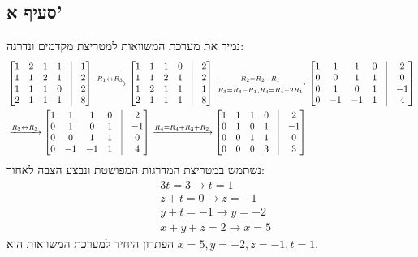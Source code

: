 \documentclass[a4paper, 10pt]{article}
\begin{document}
\begin{hebrew}
	\subsection{סעיף א'}
	נמיר את מערכת המשוואות למטריצת מקדמים ונדרגה:
	\[
		\begin{aligned}
			& \begin{bmatrix}
			1 & 2 & 1 & 1 & \vline & 1 \\
			1 & 1 & 2 & 1 & \vline & 2 \\
			1 & 1 & 1 & 0 & \vline & 2 \\
			2 & 1 & 1 & 1 & \vline & 8
			\end{bmatrix}
			\xrightarrow{R_1 \leftrightarrow R_3}
			\begin{bmatrix}
			1 & 1 & 1 & 0 & \vline & 2 \\
			1 & 1 & 2 & 1 & \vline & 2 \\
			1 & 2 & 1 & 1 & \vline & 1 \\
			2 & 1 & 1 & 1 & \vline & 8
			\end{bmatrix}
			\xrightarrow[R_3 = R_3 - R_1, R_4 = R_4 - 2R_1] {R_2 = R_2 - R_1}
			\begin{bmatrix}
			1 & 1 & 1 & 0 & \vline & 2 \\
			0 & 0 & 1 & 1 & \vline & 0 \\
			0 & 1 & 0 & 1 & \vline & -1 \\
			0 & -1 & -1 & 1 & \vline & 4
			\end{bmatrix} \\
			& \xrightarrow{R_2 \leftrightarrow R_3}
			\begin{bmatrix}
			1 & 1 & 1 & 0 & \vline & 2 \\
			0 & 1 & 0 & 1 & \vline & -1 \\
			0 & 0 & 1 & 1 & \vline & 0 \\
			0 & -1 & -1 & 1 & \vline & 4
			\end{bmatrix}
			\xrightarrow{R_4 = R_4 + R_3 + R_2}
			\begin{bmatrix}
			1 & 1 & 1 & 0 & \vline & 2 \\
			0 & 1 & 0 & 1 & \vline & -1 \\
			0 & 0 & 1 & 1 & \vline & 0 \\
			0 & 0 & 0 & 3 & \vline & 3
			\end{bmatrix}
		\end{aligned}
	\]
	נשתמש במטריצת המדרגות המפושטת ונבצע הצבה לאחור:
	\[
		\begin{aligned}
			& 3t = 3 \rightarrow t = 1 \\
			& z + t = 0 \rightarrow z = -1 \\
			& y + t = -1 \rightarrow y = -2 \\
			& x + y + z = 2 \rightarrow x = 5
		\end{aligned}
	\]
	הפתרון היחיד למערכת המשוואות הוא
	$x = 5, y = -2, z = -1, t = 1$.


\end{hebrew}
\end{document}
